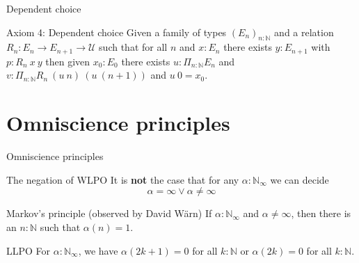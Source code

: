 \documentclass{beamer}
\begin{document}
\begin{frame}{Dependent choice}
\begin{block}{Axiom 4: Dependent choice}
  Given a family of types $(E_n)_{n:\mathbb N}$ and 
  a relation 
  $R_n:E_n\rightarrow E_{n+1}\rightarrow {\mathcal U}$ such that
  for all $n$ and $x:E_n$ there exists $y:E_{n+1}$ with $p:R_n~x~y$ 
  \pause
  then given $x_0:E_0$ there exists
  $u:\Pi_{n:\mathbb N}E_n$ and 
  $v:\Pi_{n:\mathbb N}R_n~(u~n)~(u~(n+1))$ and $u~0 = x_0$.
\end{block}
\end{frame}
\section{Omniscience principles}
\begin{frame}{Omniscience principles} 
  \begin{block}{The negation of WLPO}
    It is \textbf{not} the case that for any $\alpha:\mathbb N_\infty$ we can decide 
    $$\alpha = \infty \vee \alpha \neq \infty$$
  \end{block}
  \pause
  \begin{block}{Markov's principle (observed by David W\"arn)}
    If $\alpha: \mathbb N_\infty$ and $\alpha \neq \infty$, then there is an $n:\mathbb N$ such that $\alpha(n) = 1$. 
  \end{block}
  \pause
  \begin{block}{LLPO}
    For $\alpha:\mathbb N_\infty$, we have 
    $\alpha(2k+1) = 0 $ for all $k:\mathbb N$ or 
    $\alpha(2k) = 0$ for all $k:\mathbb N$.
  \end{block}
\end{frame}
\end{document}
